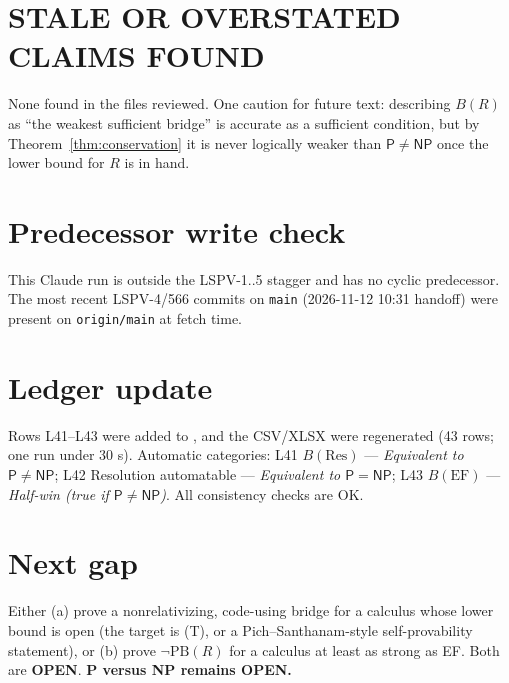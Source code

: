 \documentclass[11pt]{article}
\theoremstyle{definition}
\newcommand{\Pclass}{\mathsf{P}}
\newcommand{\NP}{\mathsf{NP}}
\newcommand{\PB}{\mathrm{PB}}
\begin{document}
\section*{STALE OR OVERSTATED CLAIMS FOUND}
None found in the files reviewed. One caution for future text: describing
$B(R)$ as ``the weakest sufficient bridge'' is accurate as a sufficient
condition, but by Theorem~\ref{thm:conservation} it is never logically weaker
than $\Pclass\neq\NP$ once the lower bound for $R$ is in hand.

\section*{Predecessor write check}
This Claude run is outside the LSPV-1..5 stagger and has no cyclic predecessor.
The most recent LSPV-4/566 commits on \texttt{main} (2026-11-12 10:31 handoff)
were present on \texttt{origin/main} at fetch time.

\section{Ledger update}\label{sec:ledger}
Rows L41--L43 were added to
, and the CSV/XLSX
were regenerated (43 rows; one run under 30 s). Automatic categories:
L41 $B(\mathrm{Res})$ --- \emph{Equivalent to $\Pclass\ne\NP$};
L42 Resolution automatable --- \emph{Equivalent to $\Pclass=\NP$};
L43 $B(\mathrm{EF})$ --- \emph{Half-win (true if $\Pclass\ne\NP$)}.
All consistency checks are OK.

\section*{Next gap}
Either (a) prove a nonrelativizing, code-using bridge for a calculus whose
lower bound is open (the target is (T), or a Pich--Santhanam-style
self-provability statement), or (b) prove $\neg\PB(R)$ for a calculus at least as
strong as EF. Both are \textbf{OPEN}. \textbf{P versus NP remains OPEN.}

\end{document}
